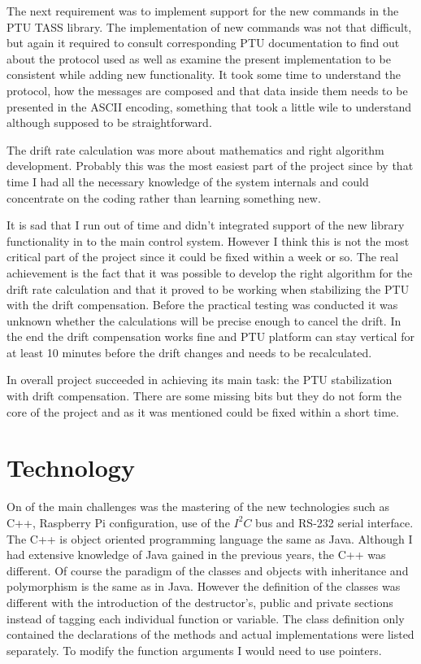 The next requirement was to implement support for the new commands in the PTU TASS library. The implementation of new commands was not that difficult, but again it required to consult corresponding PTU documentation to find out about the protocol used as well as examine the present implementation to be consistent while adding new functionality. It took some time to understand the protocol, how the messages are composed and that data inside them needs to be presented in the ASCII encoding, something that took a little wile to understand although supposed to be straightforward.

The drift rate calculation was more about mathematics and right algorithm development. Probably this was the most easiest part of the project since by that time I had all the necessary knowledge of the system internals and could concentrate on the coding rather than learning something new. 

It is sad that I run out of time and didn't integrated support of the new library functionality in to the main control system. However I think this is not the most critical part of the project since it could be fixed within a week or so. The real achievement is the fact that it was possible to develop the right algorithm for the drift rate calculation and that it proved to be working when stabilizing the PTU with the drift compensation. Before the practical testing was conducted it was unknown whether the calculations will be precise enough to cancel the drift. In the end the drift compensation works fine and PTU platform can stay vertical for at least 10 minutes before the drift changes and needs to be recalculated.

In overall project succeeded in achieving its main task: the PTU stabilization with drift compensation. There are some missing bits but they do not form the core of the project and as it was mentioned could be fixed within a short time.


\section*{Technology}
On of the main challenges was the mastering of the new technologies such as C++, Raspberry Pi configuration, use of the $I^2C$ bus and RS-232 serial interface. The C++ is object oriented programming language the same as Java. Although I had extensive knowledge of Java gained in the previous years, the C++ was different. Of course the paradigm of the classes and objects with inheritance and polymorphism is the same as in Java. However the definition of the classes was different with the introduction of the destructor's, public and private sections instead of tagging each individual function or variable. The class definition only contained the declarations of the methods and actual implementations were listed separately. To modify the function arguments I would need to use pointers.   

